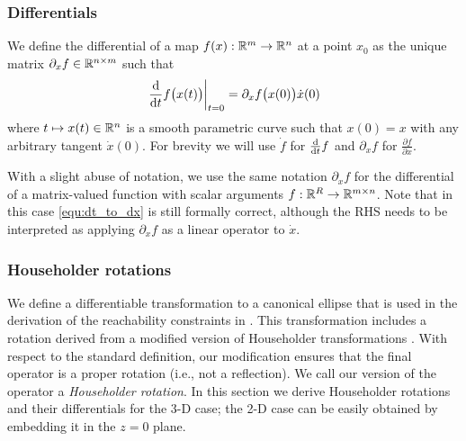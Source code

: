 \documentclass[10pt,twocolumn,twoside]{IEEEtran}
\begin{document}
\subsubsection{Differentials}
We define the differential of a map $f(x):\mathbb{R}^{m}{}\to\mathbb{R}^{n}{}$ at a point $x_0$ as the unique matrix $\partial_x f \in\mathbb{R}^{n\times m}{}$ such that
\begin{equation}\label{equ:dt_to_dx}
  \left.\frac{\mathrm{d} }{\mathrm{d} t} f\bigl(x(t)\bigr)\right|_{t=0}=\partial_x f\bigl(x(0)\bigr) \dot{x}(0)
\end{equation}
where $t\mapsto x(t)\in\mathbb{R}^{n}{}$ is a smooth parametric curve such that $x(0)=x$ with any arbitrary tangent $\dot{x}(0)$. For brevity we will use $\dot f$ for $\frac{\mathrm{d} }{\mathrm{d} t} f$ and $\partial_x f$ for $\frac{\partial f}{\partial x}$. 

With a slight abuse of notation, we use the same notation $\partial_xf$ for the differential of a matrix-valued function with scalar arguments $f:\mathbb{R}^{R}{}\to\mathbb{R}^{m\times n}{}$.  Note that in this case \eqref{equ:dt_to_dx} is still formally correct, although the RHS needs to be interpreted as applying $\partial_x f$ as a linear operator to $\dot{x}$.

 \subsubsection{Householder rotations}\label{sec:householder}
  We define a differentiable transformation to a canonical ellipse that is used in the derivation of the reachability constraints in . This transformation includes a rotation derived from a modified version of Householder transformations \cite{householder1958unitary}. With respect to the standard definition, our modification ensures that the final operator is a proper rotation (i.e., not a reflection). We call our version of the operator a \emph{Householder rotation}. In this section we derive Householder rotations and their differentials for the 3-D case; the 2-D case can be easily obtained by embedding it in the $z=0$ plane.
\end{document}

